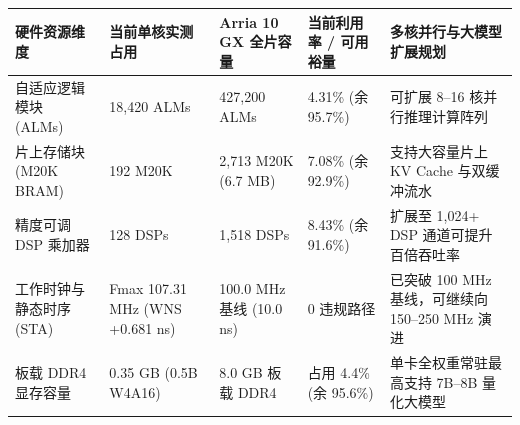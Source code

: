 \documentclass[11pt,a4paper]{article}
\begin{document}
{\footnotesize\renewcommand{\arraystretch}{1.14}\begin{longtable}{@{}L{0.19\textwidth}L{0.16\textwidth}L{0.16\textwidth}L{0.15\textwidth}L{0.24\textwidth}@{}}\toprule

\textbf{硬件资源维度} & \textbf{当前单核实测占用} & \textbf{Arria 10 GX 全片容量} & \textbf{当前利用率 /\allowbreak{} 可用裕量} & \textbf{多核并行与大模型扩展规划}\\\midrule\endhead

自适应逻辑模块 (\allowbreak{}ALMs)\allowbreak{} & 18,\allowbreak{}420 ALMs & 427,\allowbreak{}200 ALMs & 4.31\% (\allowbreak{}余 95.7\%)\allowbreak{} & 可扩展 8–16 核并行推理计算阵列\\[2pt]

片上存储块 (\allowbreak{}M20K BRAM)\allowbreak{} & 192 M20K & 2,\allowbreak{}713 M20K (\allowbreak{}6.7 MB)\allowbreak{} & 7.08\% (\allowbreak{}余 92.9\%)\allowbreak{} & 支持大容量片上 KV Cache 与双缓冲流水\\[2pt]

精度可调 DSP 乘加器 & 128 DSPs & 1,\allowbreak{}518 DSPs & 8.43\% (\allowbreak{}余 91.6\%)\allowbreak{} & 扩展至 1,\allowbreak{}024+\allowbreak{} DSP 通道可提升百倍吞吐率\\[2pt]

工作时钟与静态时序 (\allowbreak{}STA)\allowbreak{} & Fmax 107.31 MHz (\allowbreak{}WNS +\allowbreak{}0.681 ns)\allowbreak{} & 100.0 MHz 基线 (\allowbreak{}10.0 ns)\allowbreak{} & 0 违规路径 & 已突破 100 MHz 基线，可继续向 150–250 MHz 演进\\[2pt]

板载 DDR4 显存容量 & 0.35 GB (\allowbreak{}0.5B W4A16)\allowbreak{} & 8.0 GB 板载 DDR4 & 占用 4.4\% (\allowbreak{}余 95.6\%)\allowbreak{} & 单卡全权重常驻最高支持 7B–8B 量化大模型\\[2pt]

\bottomrule\end{longtable}}
\end{document}
